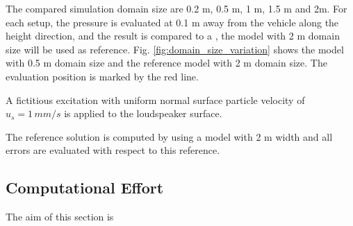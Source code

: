 The compared simulation domain size are 0.2 m, 0.5 m, 1 m, 1.5 m and 2m. For each setup, the pressure is evaluated at 0.1 m away from the vehicle along the height direction, and the result is compared to a , the model with 2 m domain size will be used as reference. Fig. \ref{fig:domain_size_variation} shows the model with 0.5 m domain size and the reference model with 2 m domain size. The evaluation position is marked by the red line.

A fictitious excitation with uniform normal surface particle velocity of $u_s = 1\,mm/s$ is applied to the loudspeaker surface.

The reference solution is computed by using a model with 2 m width and all errors are evaluated with respect to this reference.



\subsection*{Computational Effort}
The aim of this section is 

